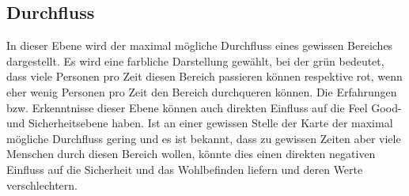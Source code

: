 \documentclass[10pt]{scrartcl}
\begin{document}
\subsection{Durchfluss}
In dieser Ebene wird der maximal m\"ogliche Durchfluss eines gewissen Bereiches dargestellt. Es wird eine farbliche Darstellung gew\"ahlt, bei der gr\"un bedeutet, dass viele Personen pro Zeit diesen Bereich passieren k\"onnen respektive rot, wenn eher wenig Personen pro Zeit den Bereich durchqueren k\"onnen.
\newline Die Erfahrungen bzw. Erkenntnisse dieser Ebene k\"onnen auch direkten Einfluss auf die Feel Good- und Sicherheitsebene haben. Ist an einer gewissen Stelle der Karte der maximal m\"ogliche Durchfluss gering und es ist bekannt, dass zu gewissen Zeiten aber viele Menschen durch diesen Bereich wollen, k\"onnte dies einen direkten negativen Einfluss auf die Sicherheit und das Wohlbefinden liefern und deren Werte verschlechtern.
\end{document}

